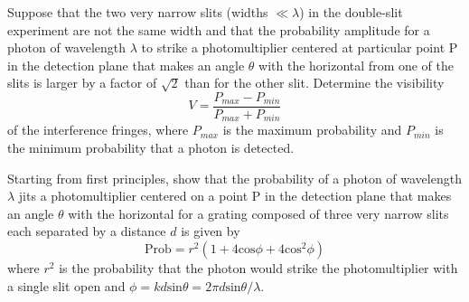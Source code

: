 \documentclass[11pt,letterpaper,boxed,noheader]{pset}
\begin{document}
    \begin{problem} [T1.29]
        Suppose that the two very narrow slits (widths $\ll \lambda$) in the double-slit experiment are not the same width and that the probability amplitude for a photon of wavelength $\lambda$ to strike a photomultiplier centered at particular point P in the detection plane that makes an angle $\theta$ with the horizontal from one of the slits is larger by a factor of $\sqrt{2}$ than for the other slit. Determine the visibility
        \[V = \frac{P_{max} - P_{min}}{P_{max}+P_{min}}\]
        of the interference fringes, where $P_{max}$ is the maximum probability and $P_{min}$ is the minimum probability that a photon is detected. 
    \end{problem}
    \newpage
    
    \begin{problem} [T1.34]
        Starting from first principles, show that the probability of a photon of wavelength $\lambda$ jits a photomultiplier centered on a point P in the detection plane that makes an angle $\theta$ with the horizontal for a grating composed of three very narrow slits each separated by a distance $d$ is given by 
        \[ \text{Prob} = r^2(1+4\text{cos}\phi + 4\text{cos}^2\phi) \]
        where $r^2$ is the probability that the photon would strike the photomultiplier with a single slit open and $\phi=kd \text{sin} \theta = 2 \pi d \text{sin} \theta/\lambda$.
    \end{problem}
\end{document}
